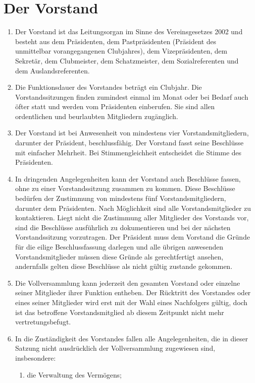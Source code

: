 \documentclass{statutclass}
\begin{document}
\section{Der Vorstand}
\begin{enumerate}
    \item Der Vorstand ist das Leitungsorgan im Sinne des Vereinsgesetzes 2002 und besteht aus dem Präsidenten, dem Pastpräsidenten (Präsident des unmittelbar vorangegangenen Clubjahres), dem Vizepräsidenten, dem Sekretär, dem Clubmeister, dem Schatzmeister, dem Sozialreferenten und dem Auslandsreferenten.
    \item Die Funktionsdauer des Vorstandes beträgt ein Clubjahr. Die Vorstandssitzungen finden zumindest einmal im Monat oder bei Bedarf auch öfter statt und werden vom Präsidenten einberufen. Sie sind allen ordentlichen und beurlaubten Mitgliedern zugänglich.
    \item Der Vorstand ist bei Anwesenheit von mindestens vier Vorstandsmitgliedern, darunter der Präsident, beschlussfähig. Der Vorstand fasst seine Beschlüsse mit einfacher Mehrheit. Bei Stimmengleichheit entscheidet die Stimme des Präsidenten.
    \item In dringenden Angelegenheiten kann der Vorstand auch Beschlüsse fassen, ohne zu einer Vorstandssitzung zusammen zu kommen. Diese Beschlüsse bedürfen der Zustimmung von mindestens fünf Vorstandsmitgliedern, darunter dem Präsidenten. Nach Möglichkeit sind alle Vorstandsmitglieder zu kontaktieren. Liegt nicht die Zustimmung aller Mitglieder des Vorstands vor, sind die Beschlüsse ausführlich zu dokumentieren und bei der nächsten Vorstandssitzung vorzutragen. Der Präsident muss dem Vorstand die Gründe für die eilige Beschlussfassung darlegen und alle übrigen anwesenden Vorstandsmitglieder müssen diese Gründe als gerechtfertigt ansehen, andernfalls gelten diese Beschlüsse als nicht gültig zustande gekommen.
    \item Die Vollversammlung kann jederzeit den gesamten Vorstand oder einzelne seiner Mitglieder ihrer Funktion entheben. Der Rücktritt des Vorstandes oder eines seiner Mitglieder wird erst mit der Wahl eines Nachfolgers gültig, doch ist das betroffene Vorstandsmitglied ab diesem Zeitpunkt nicht mehr vertretungsbefugt.
    \item In die Zuständigkeit des Vorstandes fallen alle Angelegenheiten, die in dieser Satzung nicht ausdrücklich der Vollversammlung zugewiesen sind, insbesondere:
    \begin{enumerate}
        \item die Verwaltung des Vermögens;

\end{enumerate}
\end{enumerate}
\end{document}
